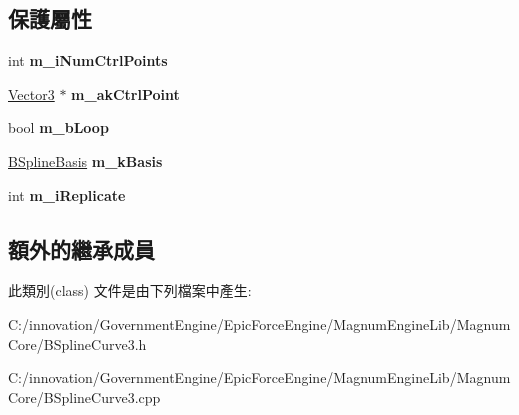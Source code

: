 \subsection*{保護屬性}
\begin{DoxyCompactItemize}
\item 
int {\bfseries m\+\_\+i\+Num\+Ctrl\+Points}\hypertarget{class_i_dream_sky_1_1_b_spline_curve3_a7299bbd623aa4390ee6e8e603a2511b0}{}\label{class_i_dream_sky_1_1_b_spline_curve3_a7299bbd623aa4390ee6e8e603a2511b0}

\item 
\hyperlink{class_i_dream_sky_1_1_vector3}{Vector3} $\ast$ {\bfseries m\+\_\+ak\+Ctrl\+Point}\hypertarget{class_i_dream_sky_1_1_b_spline_curve3_a68e997a35975e6352a5da27a69020997}{}\label{class_i_dream_sky_1_1_b_spline_curve3_a68e997a35975e6352a5da27a69020997}

\item 
bool {\bfseries m\+\_\+b\+Loop}\hypertarget{class_i_dream_sky_1_1_b_spline_curve3_ae7d6873bccc10ee4f902f86fad992b18}{}\label{class_i_dream_sky_1_1_b_spline_curve3_ae7d6873bccc10ee4f902f86fad992b18}

\item 
\hyperlink{class_i_dream_sky_1_1_b_spline_basis}{B\+Spline\+Basis} {\bfseries m\+\_\+k\+Basis}\hypertarget{class_i_dream_sky_1_1_b_spline_curve3_a23fefeea485bd1835e5236a7dbe88ade}{}\label{class_i_dream_sky_1_1_b_spline_curve3_a23fefeea485bd1835e5236a7dbe88ade}

\item 
int {\bfseries m\+\_\+i\+Replicate}\hypertarget{class_i_dream_sky_1_1_b_spline_curve3_a0f63d22a8ae005ca7ccd763f2e893b03}{}\label{class_i_dream_sky_1_1_b_spline_curve3_a0f63d22a8ae005ca7ccd763f2e893b03}

\end{DoxyCompactItemize}
\subsection*{額外的繼承成員}


此類別(class) 文件是由下列檔案中產生\+:\begin{DoxyCompactItemize}
\item 
C\+:/innovation/\+Government\+Engine/\+Epic\+Force\+Engine/\+Magnum\+Engine\+Lib/\+Magnum\+Core/B\+Spline\+Curve3.\+h\item 
C\+:/innovation/\+Government\+Engine/\+Epic\+Force\+Engine/\+Magnum\+Engine\+Lib/\+Magnum\+Core/B\+Spline\+Curve3.\+cpp\end{DoxyCompactItemize}
